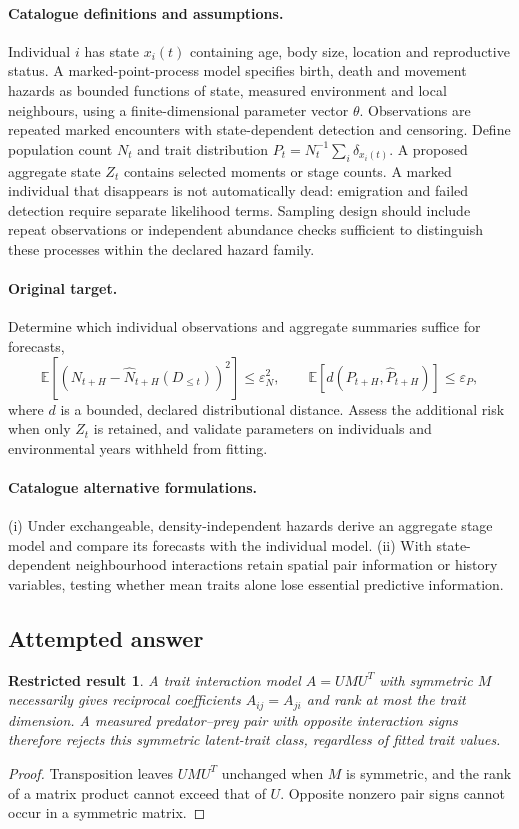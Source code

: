 \documentclass[11pt]{article}
\newcommand{\E}{\mathbb E}
\providecommand{\E}{\mathbb E}
\newtheorem{attemptresult}{Restricted result}[section]
\begin{document}
\paragraph{Catalogue definitions and assumptions.}
Individual $i$ has state $x_i(t)$ containing age, body size, location and reproductive status. A marked-point-process model specifies birth, death and movement hazards as bounded functions of state, measured environment and local neighbours, using a finite-dimensional parameter vector $\theta$. Observations are repeated marked encounters with state-dependent detection and censoring. Define population count $N_t$ and trait distribution $P_t=N_t^{-1}\sum_i\delta_{x_i(t)}$. A proposed aggregate state $Z_t$ contains selected moments or stage counts. A marked individual that disappears is not automatically dead: emigration and failed detection require separate likelihood terms. Sampling design should include repeat observations or independent abundance checks sufficient to distinguish these processes within the declared hazard family.
\paragraph{Original target.}
Determine which individual observations and aggregate summaries suffice for forecasts,
\[
 \E[(N_{t+H}-\widehat N_{t+H}(D_{\le t}))^2]\le\varepsilon_N^2,
 \qquad
 \E[d(P_{t+H},\widehat P_{t+H})]\le\varepsilon_P,
\]
where $d$ is a bounded, declared distributional distance. Assess the additional risk when only $Z_t$ is retained, and validate parameters on individuals and environmental years withheld from fitting.
\paragraph{Catalogue alternative formulations.}
(i) Under exchangeable, density-independent hazards derive an aggregate stage model and compare its forecasts with the individual model. (ii) With state-dependent neighbourhood interactions retain spatial pair information or history variables, testing whether mean traits alone lose essential predictive information.
\subsection{Attempted answer}
\begin{attemptresult}
A trait interaction model $A=UMU^T$ with symmetric $M$ necessarily gives reciprocal coefficients $A_{ij}=A_{ji}$ and rank at most the trait dimension. A measured predator--prey pair with opposite interaction signs therefore rejects this symmetric latent-trait class, regardless of fitted trait values.
\end{attemptresult}
\begin{proof}
Transposition leaves $UMU^T$ unchanged when $M$ is symmetric, and the rank of a matrix product cannot exceed that of $U$. Opposite nonzero pair signs cannot occur in a symmetric matrix.
\end{proof}
\end{document}
